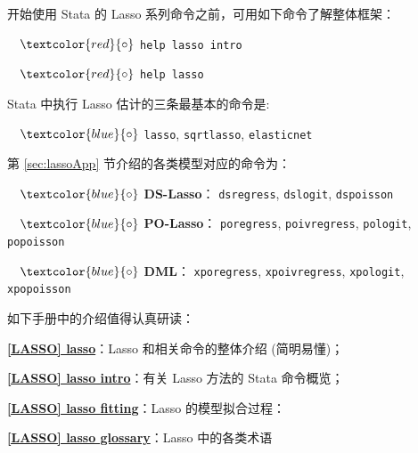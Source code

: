 {开始使用 Stata 的 Lasso 系列命令之前，可用如下命令了解整体框架：

\vspace{2pt}

$\quad \textcolor{red}{\circ}$ 
         \texttt{help lasso intro}
         
$\quad \textcolor{red}{\circ}$ 
         \texttt{help lasso}

\vspace{2pt} 


Stata 中执行 Lasso 估计的三条最基本的命令是:

\vspace{5pt}
$\quad \textcolor{blue}{\circ}$  
\texttt{lasso}, 
\texttt{sqrtlasso}, 
\texttt{elasticnet}

\vspace{5pt}
第 \ref{sec:lassoApp} 节介绍的各类模型对应的命令为：

\vspace{5pt}
$\quad \textcolor{blue}{\circ}$  
\textbf{DS-Lasso}：
   \texttt{dsregress}, 
   \texttt{dslogit}, 
   \texttt{dspoisson}

$\quad \textcolor{blue}{\circ}$ 
\textbf{PO-Lasso}：
   \texttt{poregress}, 
   \texttt{poivregress}, 
   \texttt{pologit}, 
   \texttt{popoisson}

$\quad \textcolor{blue}{\circ}$ 
\textbf{DML}：
   \texttt{xporegress}, 
   \texttt{xpoivregress}, 
   \texttt{xpologit}, 
   \texttt{xpopoisson}

\vspace{6pt}
\noindent
如下手册中的介绍值得认真研读：

\vspace{5pt}
\href{https://www.stata.com/manuals/lassolasso.pdf}{\bfseries{[\MakeUppercase{lasso}] lasso}}：Lasso 和相关命令的整体介绍 (简明易懂)；

\href{https://www.stata.com/manuals/lassolasso intro.pdf}{\bfseries{[\MakeUppercase{lasso}] lasso intro}}：有关 Lasso 方法的 Stata 命令概览；  

\href{https://www.stata.com/manuals/lassolassofitting.pdf#lassolassofitting}{\bfseries{[\MakeUppercase{lasso}] lasso fitting}}：Lasso 的模型拟合过程：

\href{https://www.stata.com/manuals/lassolasso glossary.pdf}{\bfseries{[\MakeUppercase{lasso}] lasso glossary}}：Lasso 中的各类术语 

}
